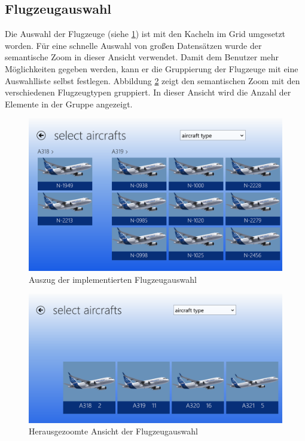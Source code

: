 \subsection{Flugzeugauswahl}
Die Auswahl der Flugzeuge (siehe \ref{aircraftSelectionImpl}) ist mit den Kacheln im Grid umgesetzt worden. Für eine schnelle Auswahl von großen Datensätzen wurde der semantische Zoom in dieser Ansicht verwendet. Damit dem Benutzer mehr Möglichkeiten gegeben werden, kann er die Gruppierung der Flugzeuge mit eine Auswahlliste selbst festlegen. Abbildung \ref{aircraftSelectionZoomImpl} zeigt den semantischen Zoom mit den verschiedenen Flugzeugtypen gruppiert.  In dieser Ansicht wird die Anzahl der Elemente in der Gruppe angezeigt. 
\begin{figure}[H]
\centering
\includegraphics[width=\hsize]{images/impl/select_aircrafts_impl}
\caption{Auszug der implementierten Flugzeugauswahl}
\label{aircraftSelectionImpl}
\end{figure}
\begin{figure}[H]
\centering
\includegraphics[width=\hsize]{images/impl/semantic_zoom_impl}
\caption{Herausgezoomte Ansicht der Flugzeugauswahl}
\label{aircraftSelectionZoomImpl}
\end{figure}

